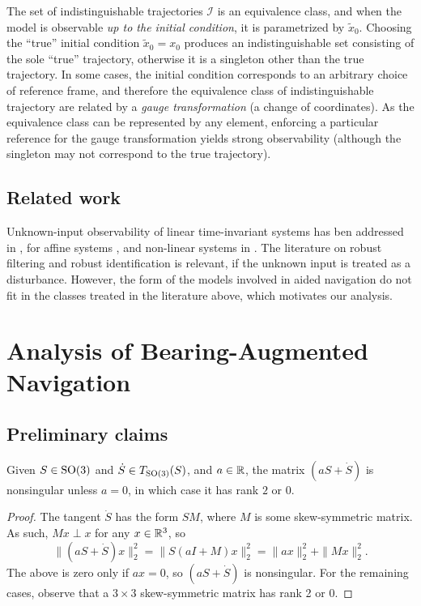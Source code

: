 The set of indistinguishable trajectories $\mathcal I$ is an equivalence class, and when the model is observable {\em up to the initial condition}, it is parametrized by $\tilde x_0$. Choosing the ``true'' initial condition $\tilde x_0 = x_0$ produces an indistinguishable set consisting of the sole ``true'' trajectory, otherwise it is a singleton other than the true trajectory. In some cases, the initial condition corresponds to an arbitrary choice of reference frame, and therefore the equivalence class of indistinguishable trajectory are related by a {\em gauge transformation} (a change of coordinates). As the equivalence class can be represented by any element, enforcing a particular reference for the gauge transformation yields strong observability (although the singleton may not correspond to the true trajectory). 


\subsection*{Related work}

Unknown-input observability of linear time-invariant systems has ben addressed in \cite{basile1969observability,hamano1983unknown}, for affine systems \cite{hammouri2010unknown}, and non-linear systems in \cite{dimassi2010robust,liberzon2012invertibility,bezzaoucha2011unknown}. The literature on robust filtering and robust identification is relevant, if the unknown input is treated as a disturbance. However, the form of the models involved in aided navigation do not fit in the classes treated in the literature above, which motivates our analysis.


\section{Analysis of Bearing-Augmented Navigation} 
\label{sect-bearing-analysis}

\subsection{Preliminary claims}

\begin{lemma}\label{lemma-one}
Given $S\in \operatorname{SO}(3)$ and $\dot S\in T_{\operatorname{SO}(3)}(S)$, 
and $a\in\mathbb{R}$, the matrix $(aS + \dot S)$ is nonsingular unless $a=0$, in which case it has rank $2$ or $0$.
\end{lemma}
\begin{proof} The tangent $\dot S$ has the form $S M$, where $M$ is some skew-symmetric matrix.
As such, $Mx\perp x$ for any $x\in\mathbb{R}^3$,  so
$$\|(aS+\dot S)x\|_2^2 = \|S(aI+M)x\|^2_2 = \|ax\|^2_2 +\|Mx\|^2_2.$$
The above is zero only if $ax=0$, so $(aS+\dot S)$ is nonsingular.
For the remaining cases, observe that a $3\times3$ skew-symmetric matrix has rank 2 or 0.
\end{proof}

